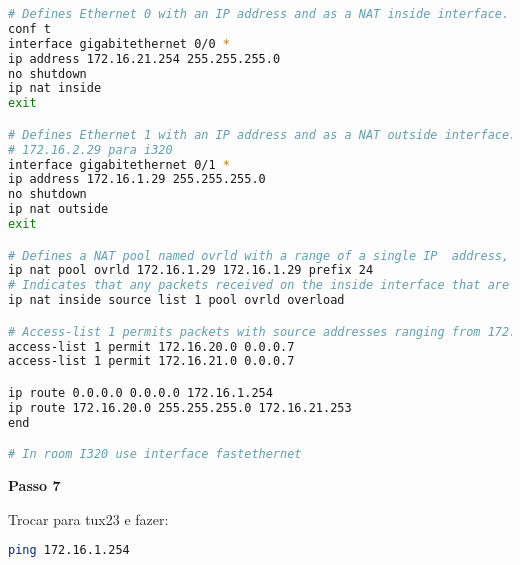 \begin{lstlisting}[language=bash]
# Defines Ethernet 0 with an IP address and as a NAT inside interface.
conf t               
interface gigabitethernet 0/0 *     
ip address 172.16.21.254 255.255.255.0 
no shutdown 
ip nat inside        
exit 

# Defines Ethernet 1 with an IP address and as a NAT outside interface.
# 172.16.2.29 para i320
interface gigabitethernet 0/1 * 
ip address 172.16.1.29 255.255.255.0 
no shutdown 
ip nat outside       
exit 

# Defines a NAT pool named ovrld with a range of a single IP  address, 172.16.1.29.
ip nat pool ovrld 172.16.1.29 172.16.1.29 prefix 24 
# Indicates that any packets received on the inside interface that are permitted by access-list 1 has the source address translated to an address out of the NAT pool named ovrld. Translations are overloaded, which allows multiple inside devices to be translated to the same valid IP address.
ip nat inside source list 1 pool ovrld overload 

# Access-list 1 permits packets with source addresses ranging from 172.16.20.0 through 172.16.20.7 and 172.16.21.0 through 172.16.21.7.
access-list 1 permit 172.16.20.0 0.0.0.7 
access-list 1 permit 172.16.21.0 0.0.0.7 

ip route 0.0.0.0 0.0.0.0 172.16.1.254 
ip route 172.16.20.0 255.255.255.0 172.16.21.253 
end

# In room I320 use interface fastethernet
\end{lstlisting}

\textbf{Passo 7}

Trocar para tux23 e fazer:
\begin{lstlisting}[language=bash]
ping 172.16.1.254
\end{lstlisting}